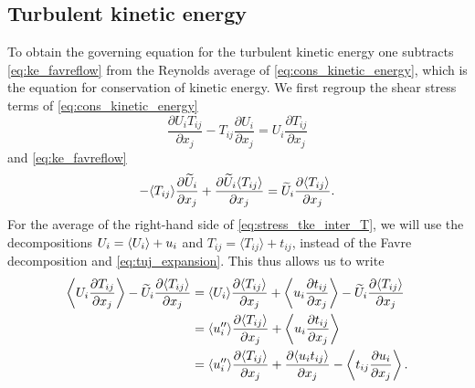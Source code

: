 \documentclass[oneside,a4paper,11pt]{report}
\begin{document}
\subsection{Turbulent kinetic energy}
To obtain the governing equation for the turbulent kinetic energy one subtracts \cref{eq:ke_favreflow} from the Reynolds average of \cref{eq:cons_kinetic_energy}, which is the equation for conservation of kinetic energy. We first regroup the shear stress terms of \cref{eq:cons_kinetic_energy}  
\begin{equation}
\label{eq:stress_tke_inter_T}
     \frac{\partial U_i T_{ij} }{\partial x_j} - T_{ij} \frac{\partial U_i}{\partial x_j} =  U_i \frac{\partial T_{ij} }{\partial x_j}
\end{equation}
and \cref{eq:ke_favreflow}
\begin{equation}
     -\langle T_{ij} \rangle \frac{ \partial \widetilde{U}_i}{\partial x_j} + \frac{ \partial \widetilde{U}_i \langle T_{ij} \rangle }{\partial x_j} = \widetilde{U}_i \frac{ \partial \langle T_{ij} \rangle}{\partial x_j}.
\end{equation}
For the average of the right-hand side of \cref{eq:stress_tke_inter_T}, we will use the decompositions $U_i = \langle U_i \rangle + u_i$ and $T_{ij} = \langle T_{ij} \rangle + t_{ij}$, instead of the Favre decomposition and \cref{eq:tuj_expansion}. This thus allows us to write 
\begin{align}
\left < U_i \frac{\partial T_{ij} }{\partial x_j} \right > - \widetilde{U}_i \frac{ \partial \langle T_{ij} \rangle}{\partial x_j} & = \langle U_i \rangle \frac{\partial \langle T_{ij} \rangle}{\partial x_j} + \left < u_i \frac{\partial t_{ij}}{\partial x_j} \right > - \widetilde{U}_i \frac{\partial \langle T_{ij} \rangle}{\partial x_j} \nonumber \\
& = \langle u_i'' \rangle \frac{\partial \langle T_{ij} \rangle}{\partial x_j} + \left < u_i \frac{\partial t_{ij}}{\partial x_j} \right > \nonumber \\
& = \langle u_i'' \rangle \frac{\partial \langle T_{ij} \rangle}{\partial x_j} + \frac{\partial \langle u_i t_{ij} \rangle}{\partial x_j} - \left <t_{ij} \frac{\partial u_i}{\partial x_j} \right >.
\end{align} 
\end{document}
